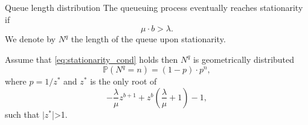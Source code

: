 \documentclass{beamer}
\begin{document}
\begin{frame}{Queue length distribution}
\scriptsize
The queueuing process eventually reaches stationarity if 
\begin{equation}\label{eq:stationarity_cond}
\mu\cdot b > \lambda.
\end{equation}
We denote by $N^q$ the length of the queue upon stationarity. 
\begin{tcolorbox}[enhanced,drop shadow, title=The blockchain efficiency theorem]
Assume that \eqref{eq:stationarity_cond} holds then $N^q$ is geometrically distributed 
$$
\mathbb{P}(N^q = n) = (1-p)\cdot p^n,
$$
where $p = 1/z^\ast$ and $z^\ast$ is the only root of 
$$
-\frac{\lambda}{\mu}z^{b+1}+z^b\left(\frac{\lambda}{\mu}+1\right) - 1,
$$
such that $|z^\ast$|>1.  
\end{tcolorbox}
\end{frame}
\end{document}
